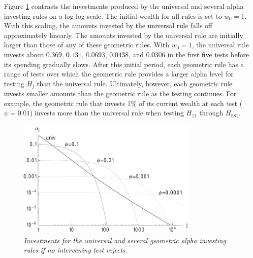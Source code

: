 \documentclass[12pt]{article}
\begin{document}
 
 Figure \ref{fig:rules} contrasts the investments produced by the universal and
 several alpha investing rules on a log-log scale.  The initial wealth for all
 rules is set to $w_0 = 1$.  With this scaling, the amounts invested by the
 universal rule falls off approximately linearly.  The amounts invested by the
 universal rule are initially larger than those of any of these geometric rules.
  With $w_0=1$, the universal rule invests about $0.369$, $0.131$, $0.0693$,
 $0.0438$, and $0.0306$ in the first five tests before its spending gradually
 slows. After this initial period, each geometric rule has a range of tests over
 which the geometric rule provides a larger alpha level for testing $H_j$ than
 the universal rule.  Ultimately, however, each geometric rule invests smaller
 amounts than the geometric rule as the testing continues.  For example, the
 geometric rule that invests 1\% of its current wealth at each test
 ($\psi=0.01$) invests more than the universal rule when testing $H_{11}$
 through $H_{581}$. 


 \begin{figure}
 \caption{ \label{fig:rules} \sl Investments for the universal and several
 geometric alpha investing rules if no intervening test rejects. }

 \centerline{
 \vspace{0.1in}
 \includegraphics[width=3.5in]{figures/rules} }
 \vspace{0.2in}
 \end{figure}


\end{document}

